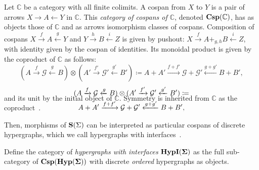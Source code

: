 \begin{definition}
Let $\mathbb{C}$ be a category with all finite colimits.  A cospan from $X$ to $Y$ is a pair of arrows $X \xrightarrow{} A \xleftarrow{} Y$  in $\mathbb{C}$.  This \textit{category of cospans of $\mathbb{C}$},  denoted $\mathbf{Csp(\mathbb{C})}$,  has as objects those of $\mathbb{C}$ and as arrows isomorphism classes of cospans.
Composition of cospans $X \xrightarrow{f} A \xleftarrow{g} Y$ and $Y \xrightarrow{h} B \xleftarrow{i} Z$ is given by pushout: $X \xrightarrow{f} A +_{g,h} B \xleftarrow{i} Z$,  with identity given by the cospan of identities.  
Its monoidal product is given by the coproduct of $\mathbb{C}$ as follows: 
\ifdefined \ONECOLUMN
\[
    (A \xrightarrow{f} \mathcal{G} \xleftarrow{g} B) \otimes (A' \xrightarrow{f'} \mathcal{G'} \xleftarrow{g'} B') \coloneq A + A' \xrightarrow{f+f'} \mathcal{G} + \mathcal{G'} \xleftarrow{g+g'} B + B'  ,
\]
\else
\vspace{-2mm}
\begin{multline*}
    (A \xrightarrow{f} \mathcal{G} \xleftarrow{g} B) \otimes (A' \xrightarrow{f'} \mathcal{G'} \xleftarrow{g'} B') \coloneq\\ A + A' \xrightarrow{f+f'} \mathcal{G} + \mathcal{G'} \xleftarrow{g+g'} B + B'  , 
    \vspace{-1.25cm}
\end{multline*}
\fi
and its unit by the initial object of $\mathbb{C}$.
Symmetry is inherited from $\mathbb{C}$ as the coproduct~\cite{MonoidalCoproduct}.
\end{definition}


Then, morphisms of $\mathbf{S}(\Sigma)$ can be interpreted as particular cospans of discrete hypergraphs,  which we call hypergraphs with interfaces~\cite{bonchi_string_2022-2}.
\begin{definition}
\label{def:cspd}
Define the category of \emph{hypergraphs with interfaces} $\mathbf{HypI(\Sigma)}$ as the full sub-category of $\mathbf{Csp(Hyp(\Sigma))}$ with discrete \textit{ordered} hypergraphs as objects.
\end{definition}

